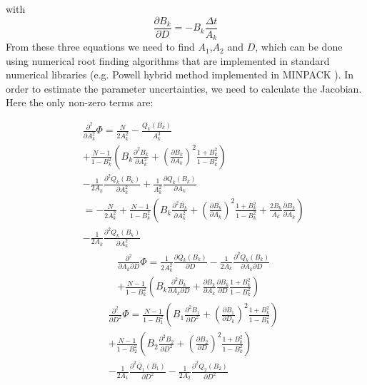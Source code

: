 \documentclass[%
 reprint,
 amsmath,amssymb,
 aps,
]{revtex4-1}
\begin{document}
with
\begin{equation}
	\frac{\partial B_{k}}{\partial D} = -B_{k}\frac{\Delta t}{A_{k}}
\end{equation}
From these three equations we need to find $A_{1}$,$A_{2}$ and $D$, which can be done using numerical root finding algorithms that are implemented in standard numerical libraries (e.g. Powell hybrid method implemented in MINPACK \cite{osti_6997568}).  In order to estimate the parameter uncertainties, we need to calculate the Jacobian.  Here the only non-zero terms are: 

\begin{eqnarray}
		&&\frac{\partial^{2}}{\partial A_{k}^2}\Phi = \frac{N}{2A_{k}^{2}} - \frac{Q_{k}(B_{k})}{A_{k}^{3}}\\
		&&+ \frac{N-1}{1-B_{k}^{2}}\left(B_{k}\frac{\partial^{2} B_{k}}{\partial A_{k}^{2}}
		+ \left(\frac{\partial B_{k}}{\partial A_{k}}\right)^{2}
		\frac{1+B_{k}^{2}}{1-B_{k}^{2}}\right)\nonumber\\
		&&-\frac{1}{2A_{k}}\frac{\partial^{2}Q_{k}(B_{k})}{\partial A_{k}^{2}}
		+\frac{1}{A_{k}^{2}}\frac{\partial Q_{k}(B_{k})}{\partial A_{k}}\nonumber\\
		&&=-\frac{N}{2A_{k}^{2}}
		+ \frac{N-1}{1-B_{k}^{2}}\left(B_{k}\frac{\partial^{2} B_{k}}{\partial A_{k}^{2}}
		+ \left(\frac{\partial B_{k}}{\partial A_{k}}\right)^{2}
		\frac{1+B_{k}^{2}}{1-B_{k}^{2}}+\frac{2B_{k}}{A_{k}}\frac{\partial B_{k}}{\partial A_{k}}\right)\nonumber\\
		&&-\frac{1}{2A_{k}}\frac{\partial^{2}Q_{k}(B_{k})}{\partial A_{k}^{2}}\nonumber
\end{eqnarray}
\begin{eqnarray}
		&&\frac{\partial^{2}}{\partial A_{k}\partial D}\Phi = \frac{1}{2A_{k}^{2}}\frac{\partial Q_{k}(B_{k})}{\partial D}
		-\frac{1}{2A_{k}}\frac{\partial^{2} Q_{k}(B_{k})}{\partial A_{k}\partial D}\\
		&&+ \frac{N-1}{1-B_{k}^{2}}\left(B_{k}\frac{\partial^{2} B_{k}}{\partial A_{k}\partial D}
		+ \frac{\partial B_{k}}{\partial A_{k}}\frac{\partial B_{k}}{\partial D}
		\frac{1+B_{k}^{2}}{1-B_{k}^{2}}
		\right)\nonumber
\end{eqnarray}
\begin{eqnarray}
		&&\frac{\partial^{2}}{\partial D^2}\Phi =
		\frac{N-1}{1-B_{1}^{2}}\left(B_{1}\frac{\partial^{2} B_{1}}{\partial D^{2}}
		+ \left(\frac{\partial B_{1}}{\partial D_{k}}\right)^{2}
		\frac{1+B_{k}^{2}}{1-B_{k}^{2}}
		\right)\nonumber\\
		&&+\frac{N-1}{1-B_{2}^{2}}\left(B_{2}\frac{\partial^{2} B_{2}}{\partial D^{2}}
		+ \left(\frac{\partial B_{2}}{\partial D}\right)^{2}
		\frac{1+B_{k}^{2}}{1-B_{k}^{2}}
		\right)\nonumber\\
		&&- \frac{1}{2A_{1}}\frac{\partial^{2}Q_{1}(B_{1})}{\partial D^{2}}
		- \frac{1}{2A_{2}}\frac{\partial^{2}Q_{2}(B_{2})}{\partial D^{2}}\nonumber
\end{eqnarray}
\end{document}
